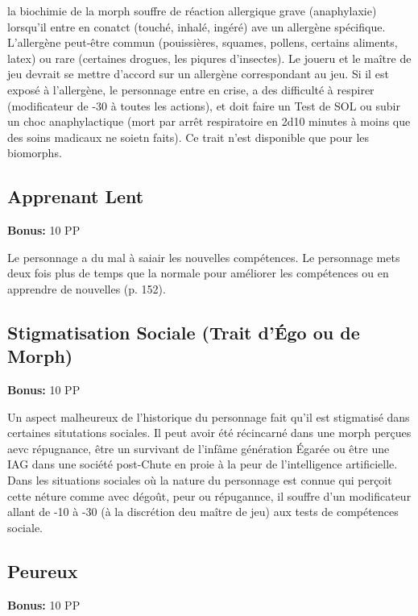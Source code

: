 la biochimie de la morph souffre de réaction allergique grave (anaphylaxie) lorsqu'il entre en conatct (touché, inhalé, ingéré) ave un allergène spécifique. L'allergène peut-être commun (pouissières, squames, pollens, certains aliments, latex) ou rare (certaines drogues, les piqures d'insectes). Le joueru et le maître de jeu devrait se mettre d'accord sur un allergène correspondant au jeu. Si il est exposé à l'allergène, le personnage entre en crise, a des difficulté à respirer (modificateur de -30 à toutes les actions), et doit faire un Test de SOL ou subir un choc anaphylactique (mort par arrêt respiratoire en 2d10 minutes à moins que des soins madicaux ne soietn faits). Ce trait n'est disponible que pour les biomorphs. 

\subsection{Apprenant Lent} \label{sec:traits-slow-learner} 

\textbf{Bonus:} 10 PP 

Le personnage a du mal à saiair les nouvelles compétences. Le personnage mets deux fois plus de temps que la normale pour améliorer les compétences ou en apprendre de nouvelles (p. 152). 

\subsection{Stigmatisation Sociale (Trait d'Égo ou de Morph)} \label{sec:traits-social-stigma} 

\textbf{Bonus:} 10 PP 

Un aspect malheureux de l'historique du personnage fait qu'il est stigmatisé dans certaines situtations sociales. Il peut avoir été récincarné dans une morph perçues aevc répugnance, être un survivant de l'infâme génération Égarée ou être une IAG dans une société post-Chute en proie à la peur de l'intelligence artificielle. Dans les situations sociales où la nature du personnage est connue qui perçoit cette néture comme avec dégoût, peur ou répugannce, il souffre d'un modificateur allant de -10 à -30 (à la discrétion deu maître de jeu) aux tests de compétences sociale. 

\subsection{Peureux} \label{sec:traits-timid} 

\textbf{Bonus:} 10 PP 

